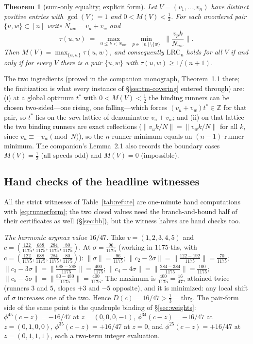 \documentclass[11pt,a4paper]{article}
\numberwithin{equation}{section}
\theoremstyle{plain}
\newtheorem{theorem}{Theorem}[section]
\theoremstyle{definition}
\theoremstyle{remark}
\newcommand{\Z}{\mathbb{Z}}
\newcommand{\wnc}[1]{\lVert #1 \rVert}
\newcommand{\lrc}{\mathrm{LRC}}
\begin{document}
\begin{theorem}[sum-only equality; explicit form]\label{thm:equality-explicit}
Let $V=(v_1,\dots,v_n)$ have distinct positive entries with $\gcd(V)=1$
and $0<M(V)<\tfrac12$. For each unordered pair $\{u,w\}\subset[n]$ write
$N_{uw}=v_u+v_w$ and
\[
\tau(u,w)\;=\;\max_{0\le k<N_{uw}}\;\min_{p\in[n]\setminus\{w\}}\;
\wnc{\frac{v_pk}{N_{uw}}}.
\]
Then $M(V)=\max_{\{u,w\}}\tau(u,w)$, and consequently $\lrc_n$ holds
for all $V$ if and only if for every $V$ there is a pair $\{u,w\}$ with
$\tau(u,w)\ge 1/(n+1)$.
\end{theorem}

The two ingredients (proved in the companion monograph, Theorem~1.1
there; the finitization is what every instance of \S\ref{sec:tm-covering}
entered through) are: (i) at a global optimum $t^\ast$ with
$0<M(V)<\tfrac12$ the binding runners can be chosen two-sided---one
rising, one falling---which forces $(v_u+v_w)t^\ast\in\Z$ for that pair,
so $t^\ast$ lies on the \emph{sum} lattice of denominator $v_u+v_w$; and
(ii) on that lattice the two binding runners are exact reflections
($\wnc{v_uk/N}=\wnc{v_wk/N}$ for all $k$, since $v_u\equiv-v_w \pmod N$),
so the $n$-runner minimum equals an $(n-1)$-runner minimum. The
companion's Lemma~2.1 also records the boundary cases $M(V)=\tfrac12$
(all speeds odd) and $M(V)=0$ (impossible).

\subsection{Hand checks of the headline witnesses}

All the strict witnesses of Table~\ref{tab:refute} are one-minute hand
computations with \eqref{eq:runnerform}; the two closed values need the
branch-and-bound half of their certificates as well
(\S\ref{sec:bb}), but the witness halves are hand checks too.

\emph{The harmonic argmax value $16/47$.} Take $v=(1,2,3,4,5)$ and
$c=(\tfrac{122}{1175},\tfrac{688}{1175},\tfrac{284}{1175},
\tfrac{80}{1175})$. At $\sigma=\tfrac{96}{1175}$ (working in
$1175$-ths, with $c=(\tfrac{122}{1175},\tfrac{688}{1175},
\tfrac{284}{1175},\tfrac{80}{1175})$):
$\wnc\sigma=\tfrac{96}{1175}$;
$\wnc{c_2-2\sigma}=\wnc{\tfrac{122-192}{1175}}=\tfrac{70}{1175}$;
$\wnc{c_3-3\sigma}=\wnc{\tfrac{688-288}{1175}}=\tfrac{400}{1175}$;
$\wnc{c_4-4\sigma}=\wnc{\tfrac{284-384}{1175}}=\tfrac{100}{1175}$;
$\wnc{c_5-5\sigma}=\wnc{\tfrac{80-480}{1175}}=\tfrac{400}{1175}$.
The maximum is $\tfrac{400}{1175}=\tfrac{16}{47}$, attained twice
(runners $3$ and $5$, slopes $+3$ and $-5$ opposite), and it is
minimized: any local shift of $\sigma$ increases one of the two. Hence
$D(c)=16/47>\tfrac13=\mathrm{thr}_5$. The pair-form side of the same
point is the quadruple binding of \S\ref{sec:weights}:
$\phi^{45}(c-z)=-16/47$ at $z=(0,0,0,-1)$, $\phi^{34}(c-z)=-16/47$ at
$z=(0,1,0,0)$, $\phi^{35}(c-z)=+16/47$ at $z=0$, and
$\phi^{25}(c-z)=+16/47$ at $z=(0,1,1,1)$, each a two-term integer
evaluation.
\end{document}
